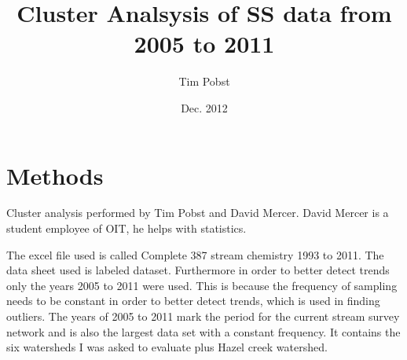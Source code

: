 \documentclass[11pt]{article} %
\title{Cluster Analsysis of SS data from 2005 to 2011}
\author{Tim Pobst}
\date{Dec. 2012} %
\begin{document}
\maketitle

\section{Methods}

Cluster analysis performed by Tim Pobst and David Mercer.  David Mercer is a student employee of OIT, he helps with statistics.
	
The excel file used is called Complete 387 stream chemistry 1993 to 2011.  The data sheet used is labeled dataset.  Furthermore in order to better detect trends only the years 2005 to 2011 were used.  This is because the frequency of sampling needs to be constant in order to better detect trends, which is used in finding outliers.  The years of 2005 to 2011 mark the period for the current stream survey network and is also the largest data set with a constant frequency.  It contains the six watersheds I was asked to evaluate plus Hazel creek watershed.
\end{document}
